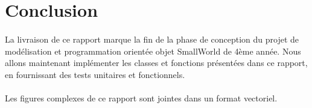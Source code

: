 \section*{Conclusion}

\paragraph{}
La livraison de ce rapport marque la fin de la phase de conception du projet de modélisation et programmation orientée objet SmallWorld de 4ème année.
Nous allons maintenant implémenter les classes et fonctions présentées dans ce rapport, en fournissant des tests unitaires et fonctionnels.

\paragraph{}
Les figures complexes de ce rapport sont jointes dans un format vectoriel.

